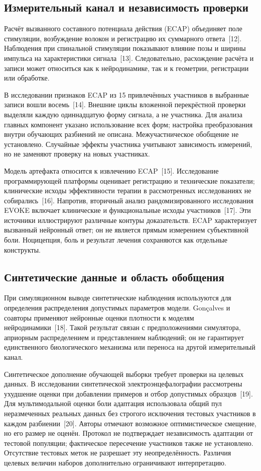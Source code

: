 \documentclass[12pt,a4paper]{article}
\begin{document}
\subsection*{Измерительный канал и независимость проверки}
Расчёт вызванного составного потенциала действия (ECAP) объединяет поле стимуляции, возбуждение волокон и регистрацию их суммарного ответа~\mbox{[12]}. Наблюдения при спинальной стимуляции показывают влияние позы и ширины импульса на характеристики сигнала~\mbox{[13]}. Следовательно, расхождение расчёта и записи может относиться как к нейродинамике, так и к геометрии, регистрации или обработке.\par
В исследовании признаков ECAP из 15 привлечённых участников в выбранные записи вошли восемь~\mbox{[14]}. Внешние циклы вложенной перекрёстной проверки выделяли каждую одиннадцатую форму сигнала, а не участника. Для анализа главных компонент указано использование всех форм; настройка преобразования внутри обучающих разбиений не описана. Межучастническое обобщение не установлено. Случайные эффекты участника учитывают зависимость измерений, но не заменяют проверку на новых участниках.\par
Модель артефакта относится к извлечению ECAP~\mbox{[15]}. Исследование программирующей платформы оценивает регистрацию и технические показатели; клинические исходы эффективности терапии в рассмотренных исследованиях не собирались~\mbox{[16]}. Напротив, вторичный анализ рандомизированного исследования EVOKE включает клинические и функциональные исходы участников~\mbox{[17]}. Эти источники иллюстрируют различные контуры доказательств. ECAP характеризует вызванный нейронный ответ; он не является прямым измерением субъективной боли. Ноцицепция, боль и результат лечения сохраняются как отдельные конструкты.\par
\subsection*{Синтетические данные и область обобщения}
При симуляционном выводе синтетические наблюдения используются для определения распределения допустимых параметров модели. Gonçalves и соавторы применяют нейронные оценки плотности к моделям нейродинамики~\mbox{[18]}. Такой результат связан с предположениями симулятора, априорным распределением и представлением наблюдений; он не гарантирует единственного биологического механизма или переноса на другой измерительный канал.\par
Синтетическое дополнение обучающей выборки требует проверки на целевых данных. В исследовании синтетической электроэнцефалографии рассмотрены ухудшение оценки при добавлении примеров и отбор допустимых образцов~\mbox{[19]}. Для мультимодальной оценки боли адаптация использовала общий пул неразмеченных реальных данных без строгого исключения тестовых участников в каждом разбиении~\mbox{[20]}. Авторы отмечают возможное оптимистическое смещение, но его размер не оценён. Протокол не подтверждает независимость адаптации от тестовой популяции; фактическое пересечение участников также не установлено. Отсутствие тестовых меток не разрешает эту неопределённость. Различия целевых величин наборов дополнительно ограничивают интерпретацию.\par
\end{document}

